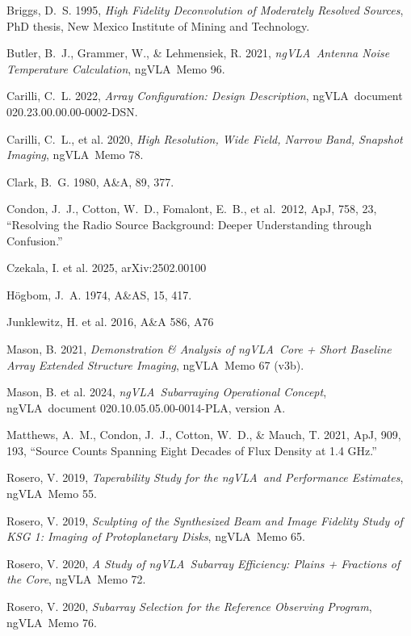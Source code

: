 \documentclass[11pt]{article}
\newcommand{\ngvla}{ngVLA}
\begin{document}
\begin{thebibliography}{}

Briggs, D.~S. 1995, {\it High Fidelity Deconvolution of Moderately
Resolved Sources}, PhD thesis, New Mexico Institute of Mining and
Technology.

Butler, B.~J., Grammer, W., \& Lehmensiek, R. 2021, {\it \ngvla\
Antenna Noise Temperature Calculation}, \ngvla\ Memo 96.

Carilli, C.~L. 2022, {\it Array Configuration: Design Description},
\ngvla\ document 020.23.00.00.00-0002-DSN.

Carilli, C.~L., et al. 2020, {\it High Resolution, Wide Field, Narrow
Band, Snapshot Imaging}, \ngvla\ Memo 78.

Clark, B.~G. 1980, A\&A, 89, 377.

Condon, J.~J., Cotton, W.~D., Fomalont, E.~B., et al.\ 2012, ApJ, 758, 23,
``Resolving the Radio Source Background: Deeper Understanding through Confusion.''
  
Czekala, I. et al. 2025, arXiv:2502.00100
  
H{\"o}gbom, J.~A. 1974, A\&AS, 15, 417.

Junklewitz, H. et al. 2016, A\&A 586, A76  

Mason, B. 2021, {\it Demonstration \& Analysis of \ngvla\ Core + Short
Baseline Array Extended Structure Imaging}, \ngvla\ Memo 67 (v3b).

Mason, B. et al. 2024, {\it \ngvla\ Subarraying Operational Concept}, \ngvla\
document 020.10.05.05.00-0014-PLA, version A.

Matthews, A.~M., Condon, J.~J., Cotton, W.~D., \& Mauch, T. 2021, ApJ, 909, 193,
 ``Source Counts Spanning Eight Decades of Flux Density at 1.4 GHz.''

\bibitem{memo55}
Rosero, V. 2019, {\it Taperability Study for the \ngvla\ and
Performance Estimates}, \ngvla\ Memo 55.

Rosero, V. 2019, {\it Sculpting of the Synthesized Beam and Image
Fidelity Study of KSG 1: Imaging of Protoplanetary Disks}, \ngvla\
Memo 65.

\bibitem{memo72}
Rosero, V. 2020, {\it A Study of \ngvla\ Subarray Efficiency: Plains +
Fractions of the Core}, \ngvla\ Memo 72.

\bibitem{memo76}
Rosero, V. 2020, {\it Subarray Selection for the Reference Observing
Program}, \ngvla\ Memo 76.


\end{thebibliography}
\end{document}
